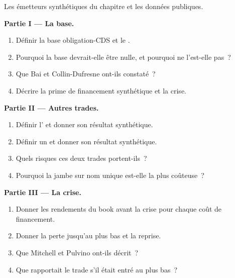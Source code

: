 \begin{problem}\label{pb:s2:credit-relative-value:1}
Les émetteurs synthétiques du chapitre et les données publiques.

\medskip\noindent\textbf{Partie I --- La base.}
\begin{enumerate}
\item Définir la base obligation-CDS et le .
\item Pourquoi la base devrait-elle être nulle, et pourquoi ne l'est-elle pas~?
\item Que Bai et Collin-Dufresne ont-ils constaté~?
\item Décrire la prime de financement synthétique et la crise.
\end{enumerate}

\medskip\noindent\textbf{Partie II --- Autres trades.}
\begin{enumerate}[resume]
\item Définir l' et donner son résultat synthétique.
\item Définir un  et donner son résultat synthétique.
\item Quels risques ces deux trades portent-ils~?
\item Pourquoi la jambe sur nom unique est-elle la plus coûteuse~?
\end{enumerate}

\medskip\noindent\textbf{Partie III --- La crise.}
\begin{enumerate}[resume]
\item Donner les rendements du book avant la crise pour chaque coût de financement.
\item Donner la perte jusqu'au plus bas et la reprise.
\item Que Mitchell et Pulvino ont-ils décrit~?
\item Que rapportait le trade s'il était entré au plus bas~?
\end{enumerate}


\end{problem}

